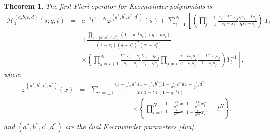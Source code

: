 \documentclass[12pt]{amsart}
\newtheorem{thm}{Theorem}[section]
\newcommand{\cH}{{\mathcal{H}}}
\numberwithin{equation}{section}
\begin{document}
\begin{thm}\label{korpier}
The first Pieri operator for Koornwinder polynomials is
\begin{eqnarray*}
%
\cH_1^{(a,b,c,d)}(s;q,t)&=&a^{-1}t^{1-N}\varphi^{(a^*,b^*,c^*,d^*)}(s)+
\sum_{i=1}^N\left[ \left(\prod_{j=1}^{i-1}\frac{s_i-t^{-1}s_j }{s_i-s_j}\frac{q s_i-t s_j}{q s_i-s_j}\right)\, T_i\right.\nonumber \\
&&+
\frac{\prod_{u\in\{a^*,b^*,c^*,d^*\}}(1-u^{-1}s_i)(q- u s_i)}{(1-s_i^2)(q-s_i^2)^2(q^2-s_i^2)}
\nonumber \\
 &&\times
 \left.
 \left(
 \prod_{j=i+1}^{N} \frac{t^{-1}s_i-s_j}{s_i-s_j}\frac{t s_i-q s_j}{s_i-q s_j} 
 \prod_{j\neq i} \frac{q-t s_i s_j }{q-s_i s_j}\frac{1-t^{-1} s_i s_j}{1-s_i s_j}\right)T_i^{-1}
 \right],
%
%
%
%
%
%
%
%
\end{eqnarray*}
where 
%
\begin{eqnarray*}\varphi^{(a^*,b^*,c^*,d^*)}(x)&=&\sum_{\epsilon=\pm 1} \frac{\big(1-\frac{\epsilon}{ q^{1/2}}a^*\big)
\big(1-\frac{\epsilon }{q^{1/2}}b^*\big)
\big(1-\frac{\epsilon }{q^{1/2}}c^*\big)\big(1- \frac{\epsilon }{q^{1/2}}d^*\big)}{2(1-t)(1-q^{-1}t)}\nonumber \\
&&\qquad \qquad\qquad \times 
\left\{ \prod_{i=1}^N  
\frac{1-\frac{\epsilon\, t }{q^{1/2}}x_i}{1-\frac{\epsilon }{q^{1/2}}x_i}\,
\frac{1-\frac{\epsilon\, t }{q^{1/2}}x_i^{-1}}{1-\frac{\epsilon }{q^{1/2}}x_i^{-1}}
-t^N\right\},
\end{eqnarray*}
and $(a^*,b^*,c^*,d^*)$ are the dual Koornwinder parameters \eqref{dua}.
\end{thm}
\end{document}
